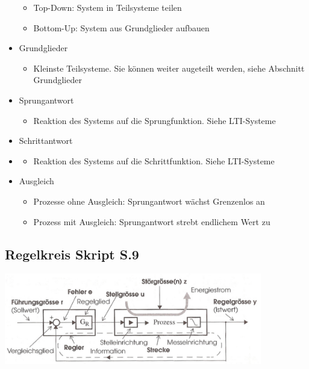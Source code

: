 \documentclass[margin=normal]{tex/hsrzf}
\newcommand{\titlewithref}[2]{\texorpdfstring{#1 {\scriptsize \color{RefColor}Skript S.#2}}{#1}}
\begin{document}
\begin{itemize}
\begin{itemize}
                  \item Top-Down: System in Teilsysteme teilen
                  \item Bottom-Up: System aus Grundglieder aufbauen
            \end{itemize}
      \item Grundglieder
            \begin{itemize}
                  \item Kleinste Teilsysteme. Sie können weiter augeteilt werden, siehe Abschnitt Grundglieder
            \end{itemize}
      \item Sprungantwort
            \begin{itemize}
                  \item Reaktion des Systems auf die Sprungfunktion. Siehe LTI-Systeme

            \end{itemize}
      \item Schrittantwort
      \item \begin{itemize}
                  \item Reaktion des Systems auf die Schrittfunktion. Siehe LTI-Systeme
            \end{itemize}
      \item Ausgleich
            \begin{itemize}
                  \item Prozesse ohne Ausgleich: Sprungantwort wächst Grenzenlos an
                  \item Prozess mit Ausgleich: Sprungantwort strebt endlichem Wert zu
            \end{itemize}
\end{itemize}
\normalsize

\subsection{\titlewithref{Regelkreis}{9}}
\includegraphics[height = 4cm]{img/Regelkreis.png}
\end{document}
